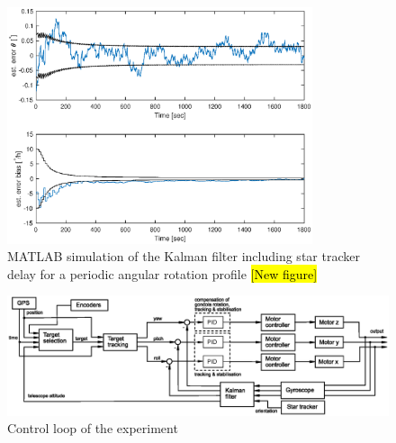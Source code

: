 \begin{figure}[htb]
	\centering
	\includegraphics[width = 0.8\textwidth]{4-experiment-design/img/software/kf_10_8_cos_3_1800.eps}
	\caption{MATLAB simulation of the Kalman filter including star tracker delay for a periodic angular rotation profile \hl{[New figure]}}
	\label{fig::software::Kalman_filter_delay_2}
\end{figure}

\newpage
\begin{landscape}
	\begin{figure}
		\includegraphics[width=\linewidth]{4-experiment-design/img/software/Control_loop.eps}
		\caption{Control loop of the experiment}
		\label{fig::software::control_loop}
	\end{figure}
\end{landscape}


\raggedbottom
